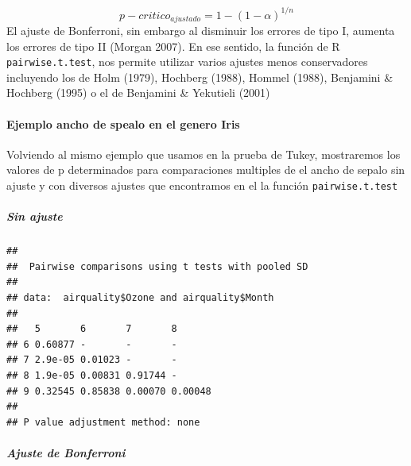 \documentclass[]{article}
\newenvironment{Shaded}{\begin{snugshade}}{\end{snugshade}}
\newcommand{\KeywordTok}[1]{\textcolor[rgb]{0.13,0.29,0.53}{\textbf{#1}}}
\newcommand{\DataTypeTok}[1]{\textcolor[rgb]{0.13,0.29,0.53}{#1}}
\newcommand{\StringTok}[1]{\textcolor[rgb]{0.31,0.60,0.02}{#1}}
\newcommand{\OperatorTok}[1]{\textcolor[rgb]{0.81,0.36,0.00}{\textbf{#1}}}
\newcommand{\NormalTok}[1]{#1}
\let\oldparagraph\paragraph
\renewcommand{\paragraph}[1]{\oldparagraph{#1}\mbox{}}
\let\oldsubparagraph\subparagraph
\renewcommand{\subparagraph}[1]{\oldsubparagraph{#1}\mbox{}}
\begin{document}
\[p-critico_{ajustado} = 1 - (1 -\alpha)^{1/n}\] El ajuste de
Bonferroni, sin embargo al disminuir los errores de tipo I, aumenta los
errores de tipo II (Morgan 2007). En ese sentido, la función de R
\texttt{pairwise.t.test}, nos permite utilizar varios ajustes menos
conservadores incluyendo los de Holm (1979), Hochberg (1988), Hommel
(1988), Benjamini \& Hochberg (1995) o el de Benjamini \& Yekutieli
(2001)

\paragraph{Ejemplo ancho de spealo en el genero
Iris}\label{ejemplo-ancho-de-spealo-en-el-genero-iris-1}

Volviendo al mismo ejemplo que usamos en la prueba de Tukey, mostraremos
los valores de p determinados para comparaciones multiples de el ancho
de sepalo sin ajuste y con diversos ajustes que encontramos en el la
función \texttt{pairwise.t.test}

\subparagraph{Sin ajuste}\label{sin-ajuste}

\begin{Shaded}
\end{Shaded}

\begin{verbatim}
## 
##  Pairwise comparisons using t tests with pooled SD 
## 
## data:  airquality$Ozone and airquality$Month 
## 
##   5       6       7       8      
## 6 0.60877 -       -       -      
## 7 2.9e-05 0.01023 -       -      
## 8 1.9e-05 0.00831 0.91744 -      
## 9 0.32545 0.85838 0.00070 0.00048
## 
## P value adjustment method: none
\end{verbatim}

\subparagraph{Ajuste de Bonferroni}\label{ajuste-de-bonferroni-1}

\begin{Shaded}
\end{Shaded}
\end{document}
